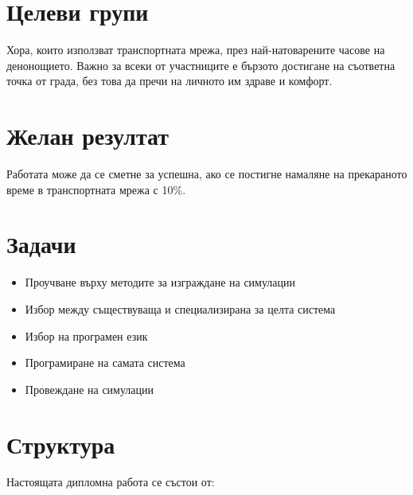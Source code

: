 \section{Целеви групи}

Хора, които използват транспортната мрежа, през най-натоварените часове на денонощието. Важно за всеки от участниците е бързото достигане на съответна точка от града, без това да пречи на личното им здраве и комфорт.

\section{Желан резултат}

Работата може да се сметне за успешна, ако се постигне намаляне на прекараното време в транспортната мрежа с 10\%.

\section{Задачи}
\begin{itemize}
\item Проучване върху методите за изграждане на симулации
\item Избор между съществуваща и специализирана за целта система
\item Избор на програмен език
\item Програмиране на самата система
\item Провеждане на симулации
\end{itemize}

\section{Структура}

Настоящата дипломна работа се състои от:

